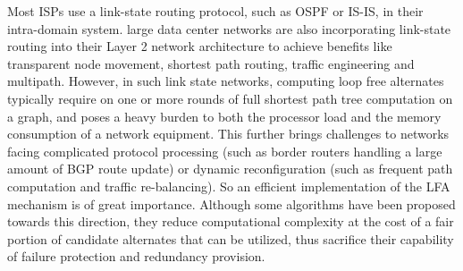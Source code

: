 Most ISPs use a link-state routing protocol, such as OSPF or IS-IS, in their intra-domain system.
large data center networks are also incorporating link-state routing into their Layer 2 network architecture \cite{perlman2011introduction, TRILL} 
to achieve benefits like transparent node movement, shortest path routing, traffic engineering and multipath.
However, in such link state networks, computing loop free alternates typically require on one or more rounds 
of full shortest path tree computation on a graph, and poses a heavy burden to both the processor load and 
the memory consumption of a network equipment. This further brings challenges to networks 
facing complicated protocol processing (such as border routers handling a large amount of BGP route update) 
or dynamic reconfiguration (such as frequent path computation and traffic re-balancing). 
So an efficient implementation of the LFA mechanism is of great importance. Although some algorithms \cite{TBFH, dmpa}
have been proposed towards this direction, they reduce computational complexity at the cost of  
a fair portion of candidate alternates that can be utilized, thus sacrifice their capability of failure protection and 
redundancy provision. 


